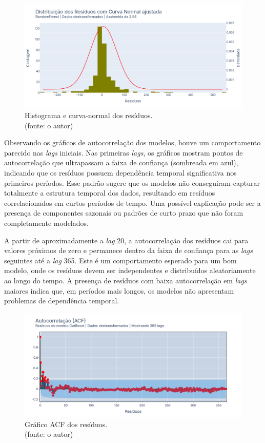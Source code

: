 \begin{figure}[!h]
\centering
\includegraphics[scale=0.33]{Figuras/jequiti/resultados/RF_WFV_LOG_RESID_x_CURVA_NORMAL.png}
\caption{Histograma e curva-normal dos resíduos.\\(fonte: o autor)}
\label{fig:jequiti_RF_WFV_LOG_RESID_x_CURVA_NORMAL}
\end{figure}
\clearpage

Observando os gráficos de autocorrelação dos modelos, houve um comportamento parecido nas \textit{lags} iniciais. Nas primeiras \textit{lags}, os gráficos mostram pontos de autocorrelação que ultrapassam a faixa de confiança (sombreada em azul), indicando que os resíduos possuem dependência temporal significativa nos primeiros períodos. Esse padrão sugere que os modelos não conseguiram capturar totalmente a estrutura temporal dos dados, resultando em resíduos correlacionados em curtos períodos de tempo. Uma possível explicação pode ser a presença de componentes sazonais ou padrões de curto prazo que não foram completamente modelados.

A partir de aproximadamente a \textit{lag} 20, a autocorrelação dos resíduos cai para valores próximos de zero e permanece dentro da faixa de confiança para as \textit{lags} seguintes até a \textit{lag} 365. Este é um comportamento esperado para um bom modelo, onde os resíduos devem ser independentes e distribuídos aleatoriamente ao longo do tempo. A presença de resíduos com baixa autocorrelação em \textit{lags} maiores indica que, em períodos mais longos, os modelos não apresentam problemas de dependência temporal.

\begin{figure}[!h]
\centering
\includegraphics[scale=0.33]{Figuras/jequiti/resultados/CB_WFV_LOG_RESID_ACF.png}
\caption{Gráfico ACF dos resíduos.\\(fonte: o autor)}
\label{fig:jequiti_CB_WFV_LOG_RESID_ACF}
\end{figure}

